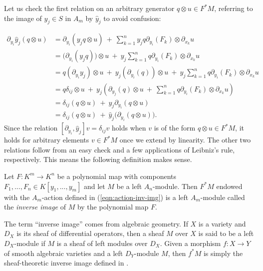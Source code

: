Let us check the first relation on an arbitrary generator $q\otimes u \in F^*M$, referring to the image of $y_j \in S$ in $A_m$ by $\hat{y}_j$ to avoid confusion:

\begin{align*}
	\partial_{y_i}\hat{y}_j(q\otimes u)
	  &= \partial_{y_i}(y_j q \otimes u) ~+~ \sum_{k=1}^n y_jq\partial_{y_i}(F_k) \otimes \partial_{x_k}u \\
	  &= \big(\partial_{y_i}(y_j q)\big)\otimes u ~+~ y_j \sum_{k=1}^n q \partial_{y_i}(F_k) \otimes \partial_{x_k}u \\
	  &= q(\partial_{y_i}y_j)\otimes u ~+~ y_j(\partial_{y_i}(q))\otimes u ~+~ y_j \sum_{k=1}^n q \partial_{y_i}(F_k) \otimes \partial_{x_k}u \\
	  &= q\delta_{ij} \otimes u ~+~ y_j\left(\partial_{y_j}(q) \otimes u ~+~ \sum_{k=1}^n q\partial_{y_i}(F_k) \otimes \partial_{x_k}u\right) \\
	  &= \delta_{ij}(q\otimes u) ~+~ y_j\partial_{y_i}(q\otimes u) \\
	  &= \delta_{ij}(q\otimes u) ~+~ \hat{y}_j\big(\partial_{y_i}(q\otimes u)\big).
\end{align*}
Since the relation $[\partial_{y_i},\hat{y}_j]v = \delta_{ij}v$ holds when $v$ is of the form $q\otimes u \in F^*M$, it holds for arbitrary elements $v\in F^*M$ once we extend by linearity. The other two relations follow from an easy check and a few applications of Leibniz's rule, respectively.  This means the following definition makes sense.

\begin{defn}\label{defn:inv-img}
	Let $F:K^m\to K^n$ be a polynomial map with components $F_1,...,F_n \in K[y_1,...,y_m]$ and let $M$ be a left $A_n$-module. Then $F^*M$ endowed with the $A_m$-action defined in (\ref{eqn:action-inv-img}) is a left $A_m$-module called the \emph{inverse image} of $M$ by the polynomial map $F$.
\end{defn}

\begin{rmk}\label{rmk:inv-img}
	The term ``inverse image'' comes from algebraic geometry. If $X$ is a variety and $D_X$ is its sheaf of differential operators, then a sheaf $M$ over $X$ is said to be a left $D_X$-module if $M$ is a sheaf of left modules over $D_X$. Given a morphism $f:X\to Y$ of smooth algebraic varieties and a left $D_Y$-module $M$, then $f^*M$ is simply the sheaf-theoretic inverse image defined in \cite{hartshorne}.
\end{rmk}





